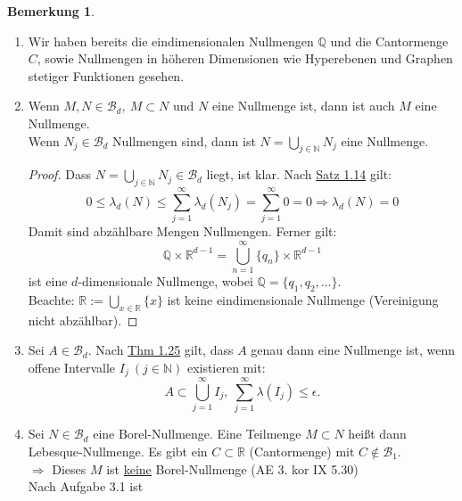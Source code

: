 \documentclass[a4paper]{scrreprt}
\newcommand{\R}{\mathbb{R}}
\newcommand{\N}{\mathbb{N}}
\newcommand{\Q}{\mathbb{Q}}
\newcommand{\Borel}{\mathcal{B}}
\newcommand{\Bd}{\Borel_d}
\newcommand{\jlabel}[1]{\label{j_#1}}
\newcommand{\jhyperref}[2]{\hyperref[j_#1]{#2}}
\newcommand{\jlink}[1]{\jhyperref{#1}{#1}}
\theoremstyle{plain}
\theoremstyle{definition}
\newtheorem{bem}[thm]{Bemerkung}
\begin{document}
{{{{\jlabel{Bem 3.2}
\begin{bem}
    \begin{enumerate}
        \item 
            Wir haben bereits die eindimensionalen Nullmengen $\Q$ und die Cantormenge $C$, sowie Nullmengen in höheren Dimensionen wie Hyperebenen und Graphen stetiger Funktionen gesehen.
        \item
            Wenn $M,N\in \Bd, \ M\subset N$ und $N$ eine Nullmenge ist, dann ist auch $M$ eine Nullmenge.\\
            Wenn $N_j \in \Bd$ Nullmengen sind, dann ist $N= \bigcup_{j\in\N} N_j$ eine Nullmenge.
            \begin{proof}
                Dass $N = \bigcup_{j\in\N} N_j \in\Bd$ liegt, ist klar. Nach \jlink{Satz 1.14} gilt:
                \begin{displaymath}
                    0\le \lambda_d(N) \le \sum_{j=1}^\infty \lambda_d(N_j) = \sum_{j=1}^\infty 0 = 0 \Rightarrow \lambda_d(N) = 0
                \end{displaymath}
                Damit sind abzählbare Mengen Nullmengen. Ferner gilt:
                \begin{displaymath}
                    \Q \times \R^{d-1} = \bigcup_{n=1}^\infty \{q_n\} \times \R^{d-1}
                \end{displaymath}
                ist eine $d$-dimensionale Nullmenge, wobei $\Q = \{q_1, q_2, \dots\}$.\\
                Beachte: $\R := \bigcup_{x\in\R} \{x\}$ ist keine eindimensionale Nullmenge (Vereinigung nicht abzählbar).
            \end{proof}
        \item
            Sei $A\in\Bd$. Nach \jlink{Thm 1.25} gilt, dass $A$ genau dann eine Nullmenge ist, wenn offene Intervalle $I_j \ (j\in\N)$ existieren mit:
            \begin{displaymath}
                A\subset \bigcup_{j=1}^\infty I_j, \ \sum_{j=1}^\infty \lambda(I_j) \le \epsilon.
            \end{displaymath}
        \item
            Sei $N\in\Bd$ eine Borel-Nullmenge. Eine Teilmenge $M\subset N$ heißt dann Lebesque-Nullmenge. Es gibt ein $C\subset \R$ (Cantormenge) mit $C \notin \Borel_1$.\\
            $\Rightarrow$ Dieses $M$ ist \uline{keine} Borel-Nullmenge (AE 3. kor IX 5.30)\\
            Nach Aufgabe 3.1 ist 

\end{enumerate}
\end{bem}}}}}
\end{document}
